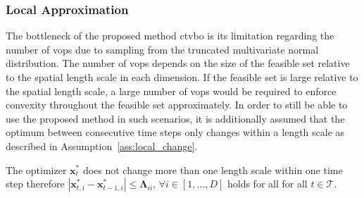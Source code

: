\subsubsection{Local Approximation}

The bottleneck of the proposed method \gls{ctvbo} is its limitation regarding the number of \glspl{vop} due to sampling from the truncated multivariate normal distribution. The number of \glspl{vop} depends on the size of the feasible set relative to the spatial length scale in each dimension. If the feasible set is large relative to the spatial length scale, a large number of \glspl{vop} would be required to enforce convexity throughout the feasible set approximately. In order to still be able to use the proposed method in such scenarios, it is additionally assumed that the optimum between consecutive time steps only changes within a length scale as described in Assumption~\ref{ass:local_change}.

\begin{assumption}
The optimizer $\mathbf{x}^*_t$ does not change more than one length scale within one time step therefore $|\mathbf{x}^*_{t,i} - \mathbf{x}^*_{t-1,i}| \leq \boldsymbol\Lambda_{ii}, \, \forall i \in [1,\dots,D]$ holds for all for all $t \in \mathcal{T}$.
\label{ass:local_change}
\end{assumption}

